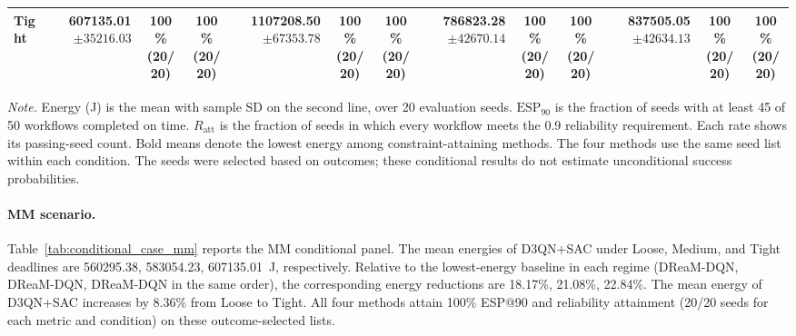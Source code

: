 \begin{table}[!t]
\begin{tabular}{@{}l*{4}{rcc}@{}}
Tight & \shortstack[r]{\textbf{607135.01}\\$\pm 35216.03$} & \shortstack[c]{100\%\\(20/20)} & \shortstack[c]{100\%\\(20/20)} & \shortstack[r]{1107208.50\\$\pm 67353.78$} & \shortstack[c]{100\%\\(20/20)} & \shortstack[c]{100\%\\(20/20)} & \shortstack[r]{786823.28\\$\pm 42670.14$} & \shortstack[c]{100\%\\(20/20)} & \shortstack[c]{100\%\\(20/20)} & \shortstack[r]{837505.05\\$\pm 42634.13$} & \shortstack[c]{100\%\\(20/20)} & \shortstack[c]{100\%\\(20/20)} \\
\bottomrule
\end{tabular}
\par\vspace{3pt}
\parbox{\textwidth}{\footnotesize
\textit{Note.} Energy (J) is the mean with sample SD on the second line, over 20 evaluation seeds.
$\mathrm{ESP}_{90}$ is the fraction of seeds with at least 45 of 50 workflows completed on time.
$R_{\mathrm{att}}$ is the fraction of seeds in which every workflow meets the 0.9 reliability requirement.
Each rate shows its passing-seed count. Bold means denote the lowest energy among constraint-attaining methods.
The four methods use the same seed list within each condition.
The seeds were selected based on outcomes; these conditional results do not estimate unconditional success probabilities.}
\endgroup
\end{table}

\paragraph{MM scenario.}
Table~\ref{tab:conditional_case_mm} reports the MM conditional panel. The mean energies of D3QN+SAC under Loose, Medium, and Tight deadlines are 560295.38, 583054.23, 607135.01~J, respectively. Relative to the lowest-energy baseline in each regime (DReaM-DQN, DReaM-DQN, DReaM-DQN in the same order), the corresponding energy reductions are 18.17\%, 21.08\%, 22.84\%. The mean energy of D3QN+SAC increases by 8.36\% from Loose to Tight. All four methods attain 100\% ESP@90 and reliability attainment (20/20 seeds for each metric and condition) on these outcome-selected lists.

